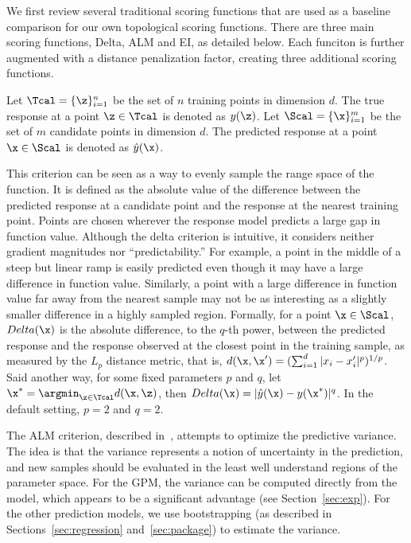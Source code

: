 We first review several traditional scoring functions that are used as a baseline comparison for our own topological scoring functions.
%
There are three main scoring functions, Delta, ALM and EI, as detailed below.
%
Each funciton is further augmented with a distance penalization factor, creating three additional scoring functions.

Let $\Tcal = \{\z\}_{i=1}^{n}$ be the set of $n$ training points in dimension $d$.
%
The true response at a point $\z \in \Tcal$ is denoted as $y(\z)$.
%
Let $\Scal = \{\x\}_{i=1}^{m}$ be the set of $m$ candidate points in dimension $d$.
%
The predicted response at a point $\x \in \Scal$ is denoted as $\hat{y}(\x)$.

 This criterion can be seen as a way to evenly sample the range space of the function.
%
It is defined as the absolute value of the difference between the predicted response at a candidate point and the response at the nearest training point.
%
Points are chosen wherever the response model predicts a large gap in function value.
%
Although the delta criterion is intuitive, it considers neither gradient magnitudes nor ``predictability.''
%
For example, a point in the middle of a steep but linear ramp is easily predicted even though it may have a large difference in function value.
%
Similarly, a point with a large difference in function value far away from the nearest sample may not be as interesting as a slightly smaller difference in a highly sampled region.
%
Formally, for a point $\x \in \Scal$, $Delta(\x)$ is the absolute difference, to the $q$-th power, between the predicted response and the response observed at the closest point in the training sample, as measured by the $L_p$ distance metric, that is, $d(\x,\x') = (\sum_{i=1}^{d}|x_i-x'_i|^p)^{1/p}$.
%
Said another way, for some fixed parameters $p$ and $q$, let $\x^* = \argmin_{\z \in \Tcal} d(\x,\z)$, then $Delta(\x) = |\hat{y}(\x) - y(\x^*)|^q$.
%
In the default setting, $p = 2$ and $q = 2$.

 The ALM criterion, described in~\cite{MacKay1992}, attempts to optimize the predictive variance.
%
The idea is that the variance represents a notion of uncertainty in the prediction, and new samples should be evaluated in the least well understand regions of the parameter space.
%
For the GPM, the variance can be computed directly from the model, which appears to be a significant advantage (see Section~\ref{sec:exp}).
%
For the other prediction models, we use bootstrapping (as described in Sections~\ref{sec:regression} and~\ref{sec:package}) to estimate the variance.

